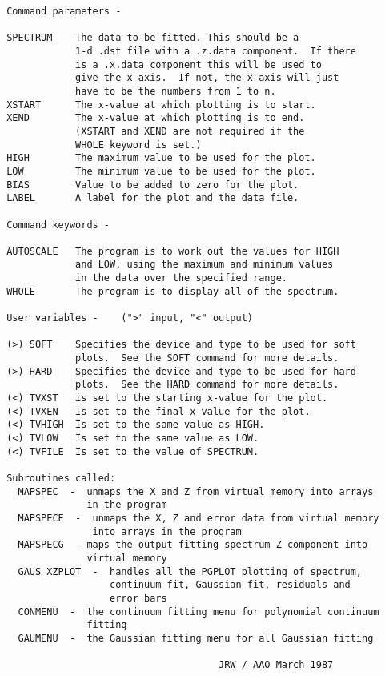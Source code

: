 \begin{description}
\begin{verbatim}
 Command parameters -

 SPECTRUM    The data to be fitted. This should be a
             1-d .dst file with a .z.data component.  If there
             is a .x.data component this will be used to
             give the x-axis.  If not, the x-axis will just
             have to be the numbers from 1 to n.
 XSTART      The x-value at which plotting is to start.
 XEND        The x-value at which plotting is to end.
             (XSTART and XEND are not required if the
             WHOLE keyword is set.)
 HIGH        The maximum value to be used for the plot.
 LOW         The minimum value to be used for the plot.
 BIAS        Value to be added to zero for the plot.
 LABEL       A label for the plot and the data file.

 Command keywords -

 AUTOSCALE   The program is to work out the values for HIGH
             and LOW, using the maximum and minimum values
             in the data over the specified range.
 WHOLE       The program is to display all of the spectrum.

 User variables -    (">" input, "<" output)

 (>) SOFT    Specifies the device and type to be used for soft
             plots.  See the SOFT command for more details.
 (>) HARD    Specifies the device and type to be used for hard
             plots.  See the HARD command for more details.
 (<) TVXST   is set to the starting x-value for the plot.
 (<) TVXEN   Is set to the final x-value for the plot.
 (<) TVHIGH  Is set to the same value as HIGH.
 (<) TVLOW   Is set to the same value as LOW.
 (<) TVFILE  Is set to the value of SPECTRUM.

 Subroutines called:
   MAPSPEC  -  unmaps the X and Z from virtual memory into arrays
               in the program
   MAPSPECE  -  unmaps the X, Z and error data from virtual memory
                into arrays in the program
   MAPSPECG  - maps the output fitting spectrum Z component into
               virtual memory
   GAUS_XZPLOT  -  handles all the PGPLOT plotting of spectrum,
                   continuum fit, Gaussian fit, residuals and
                   error bars
   CONMENU  -  the continuum fitting menu for polynomial continuum
               fitting
   GAUMENU  -  the Gaussian fitting menu for all Gaussian fitting

                                      JRW / AAO March 1987
\end{verbatim}
\end{description}
